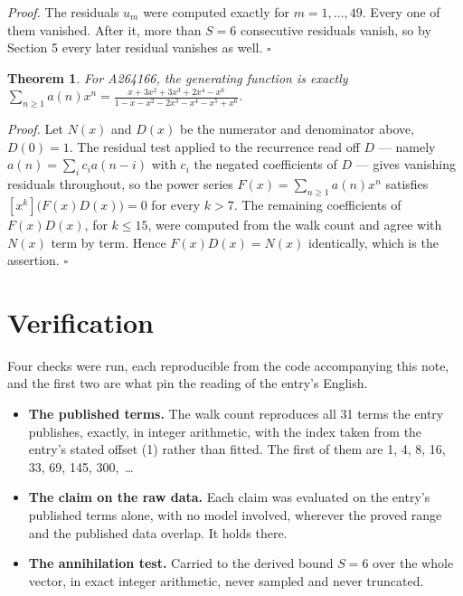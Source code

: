 \documentclass[11pt]{article}
\newtheorem{theorem}{Theorem}
\theoremstyle{definition}
\begin{document}
{\itshape Proof.} The residuals $u_m$ were computed exactly for $m = 1,\dots,49$. Every one of them vanished. After it, more than $S = 6$ consecutive residuals vanish, so by Section 5 every later residual vanishes as well. $\square$

\begin{theorem} For A264166, the generating function is exactly $\sum_{n\ge 1} a(n)x^n = \frac{x + 3x^{2} + 3x^{3} + 2x^{4} - x^{6}}{1 - x - x^{2} - 2x^{3} - x^{4} - x^{5} + x^{6}}$.\end{theorem}

{\itshape Proof.} Let $N(x)$ and $D(x)$ be the numerator and denominator above, $D(0)=1$. The residual test applied to the recurrence read off $D$ --- namely $a(n) = \sum_i c_i a(n-i)$ with $c_i$ the negated coefficients of $D$ --- gives vanishing residuals throughout, so the power series $F(x)=\sum_{n\ge 1}a(n)x^n$ satisfies $[x^k]\bigl(F(x)D(x)\bigr) = 0$ for every $k > 7$. The remaining coefficients of $F(x)D(x)$, for $k \le 15$, were computed from the walk count and agree with $N(x)$ term by term. Hence $F(x)D(x) = N(x)$ identically, which is the assertion. $\square$

\section{Verification}

Four checks were run, each reproducible from the code accompanying this note, and the first two are what pin the reading of the entry's English.

\begin{itemize}

\item {\bfseries The published terms.} The walk count reproduces all 31 terms the entry publishes, exactly, in integer arithmetic, with the index taken from the entry's stated offset (1) rather than fitted. The first of them are 1, 4, 8, 16, 33, 69, 145, 300,~\dots

\item {\bfseries The claim on the raw data.} Each claim was evaluated on the entry's published terms alone, with no model involved, wherever the proved range and the published data overlap. It holds there.

\item {\bfseries The annihilation test.} Carried to the derived bound $S = 6$ over the whole vector, in exact integer arithmetic, never sampled and never truncated.

\end{itemize}
\end{document}
